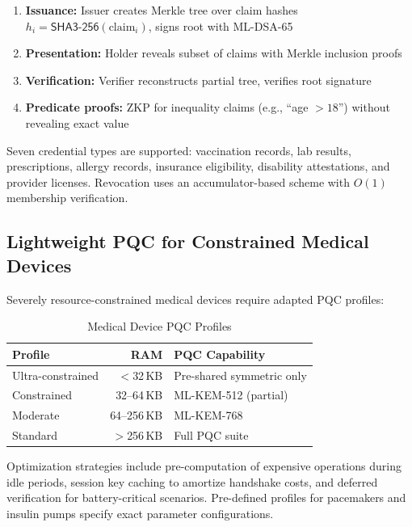 \documentclass[conference,10pt]{IEEEtran}
\newcommand{\mldsa}{\textsf{ML-DSA}}
\newcommand{\shaiii}{\textsf{SHA3-256}}
\begin{document}
\begin{enumerate}
    \item \textbf{Issuance:} Issuer creates Merkle tree over claim hashes $h_i = \shaiii{}(\text{claim}_i)$, signs root with \mldsa{}-65
    \item \textbf{Presentation:} Holder reveals subset of claims with Merkle inclusion proofs
    \item \textbf{Verification:} Verifier reconstructs partial tree, verifies root signature
    \item \textbf{Predicate proofs:} ZKP for inequality claims (e.g., ``age $> 18$'') without revealing exact value
\end{enumerate}

Seven credential types are supported: vaccination records, lab results, prescriptions, allergy records, insurance eligibility, disability attestations, and provider licenses. Revocation uses an accumulator-based scheme with $O(1)$ membership verification.

\subsection{Lightweight PQC for Constrained Medical Devices}

Severely resource-constrained medical devices require adapted PQC profiles:

\begin{table}[t]
\centering
\caption{Medical Device PQC Profiles}
\label{tab:lightweight}
\begin{tabular}{lrl}
\toprule
\textbf{Profile} & \textbf{RAM} & \textbf{PQC Capability} \\
\midrule
Ultra-constrained & $<$32\,KB & Pre-shared symmetric only \\
Constrained & 32--64\,KB & ML-KEM-512 (partial) \\
Moderate & 64--256\,KB & ML-KEM-768 \\
Standard & $>$256\,KB & Full PQC suite \\
\bottomrule
\end{tabular}
\end{table}

Optimization strategies include pre-computation of expensive operations during idle periods, session key caching to amortize handshake costs, and deferred verification for battery-critical scenarios. Pre-defined profiles for pacemakers and insulin pumps specify exact parameter configurations.

\end{document}
